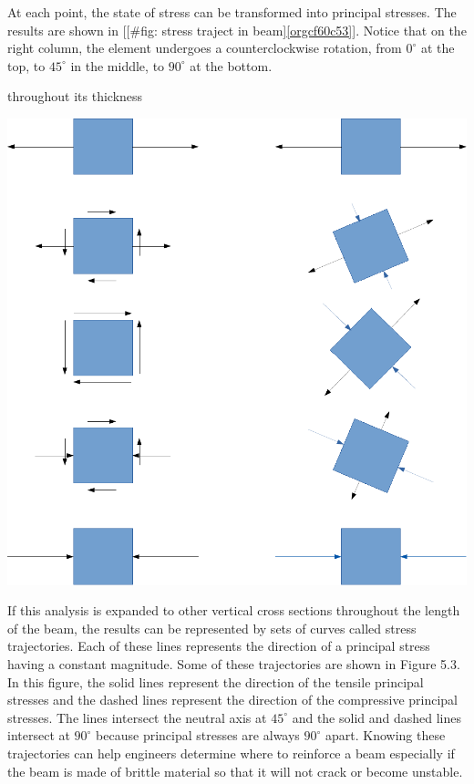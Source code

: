 \documentclass[a4paper,openany,12pt]{book}
\begin{document}
{{At each point, the state of stress can be transformed into principal
stresses. The results are shown in
[[\#fig: stress traject in beam]\ref{orgcf60c53}]. Notice
that on the right column, the element undergoes a counterclockwise
rotation, from \(0^{\circ}\) at the top, to \(45^{\circ}\) in the middle, to
\(90^{\circ}\) at the bottom.


throughout its thickness
\begin{center}
\includegraphics[width=.9\linewidth]{pictures/Simple-load-bearing/stress-traject-beam.pdf}
\label{orgcf60c53}
\end{center}

If this analysis is expanded to other vertical cross sections throughout
the length of the beam, the results can be represented by sets of curves
called stress trajectories. Each of these lines represents the direction
of a principal stress having a constant magnitude. Some of these
trajectories are shown in Figure 5.3. In this figure, the solid lines
represent the direction of the tensile principal stresses and the dashed
lines represent the direction of the compressive principal stresses. The
lines intersect the neutral axis at \(45^{\circ}\) and the solid and dashed
lines intersect at \(90^{\circ}\) because principal stresses are always
\(90^{\circ}\) apart. Knowing these trajectories can help engineers
determine where to reinforce a beam especially if the beam is made of
brittle material so that it will not crack or become unstable.

}}
\end{document}

